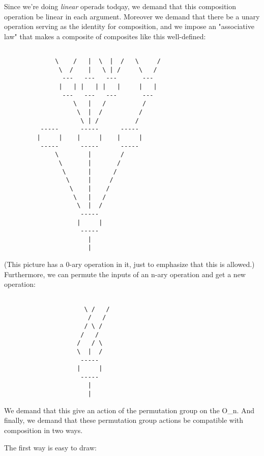 Since we're doing \emph{linear} operads todqay, we demand that this
composition operation be linear in each argument.  Moreover we demand
that there be a unary operation serving as the identity for
composition, and we impose an "associative law" that makes a
composite of composites like this well-defined:


\begin{verbatim}

              \    /   |  \  |  /   \     / 
               \  /    |   \ | /     \   / 
                ---   ---   ---       ---
               |   | |   | |   |     |   |
                ---   ---   ---       ---
                   \   |   /          /
                    \  |  /          / 
                     \ | /          / 
          -----      -----      -----
         |     |    |     |    |     |
          -----      -----      -----
              \        |        /  
               \       |       /   
                \      |      /
                 \     |     / 
                  \    |    / 
                   \   |   /   
                    \  |  /
                     -----
                    |     | 
                     -----
                       |
                       |
\end{verbatim}
    
(This picture has a 0-ary operation in it, just to emphasize that this
is allowed.)  Furthermore, we can permute the inputs of an n-ary
operation and get a new operation:
                      

\begin{verbatim}

                      \ /   /
                       /   /
                      / \ /    
                     /   /   
                    /   / \
                    \  |  /
                     -----
                    |     | 
                     -----
                       |
                       |
\end{verbatim}
    

We demand that this give an action of the permutation group on the
O_{n}.  And finally, we demand that these permutation group
actions be compatible with composition in two ways.

The first way is easy to draw:


